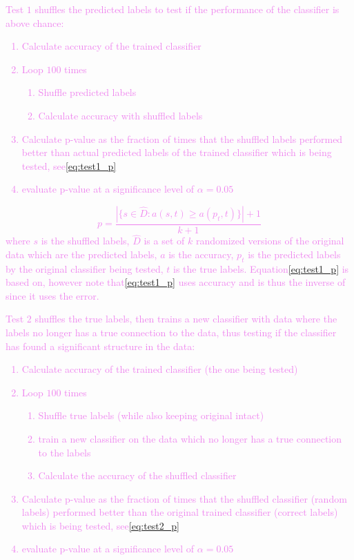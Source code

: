 \textcolor{violet}{Test $1$ shuffles the predicted labels to test if the performance of the classifier is above chance:
	\begin{enumerate}
		\item Calculate accuracy of the trained classifier
		\item Loop $100$ times
		      \begin{enumerate}
			      \item Shuffle predicted labels
			      \item Calculate accuracy with shuffled labels
		      \end{enumerate}
		\item Calculate p-value as the fraction of times that the shuffled labels performed better than actual predicted labels of the trained classifier which is being tested, see\:\eqref{eq:test1_p}
		\item evaluate p-value at a significance level of $\alpha = 0.05$
	\end{enumerate}
}
\textcolor{violet}{
	\begin{dmath}
		\label{eq:test1_p}
		p = \frac{|\{s\in\hat{D}: a(s,t) \ge a(p_t,t)\}|+1}{k+1}
	\end{dmath}
	where $s$ is the shuffled labels, $\hat{D}$ is a set of $k$ randomized versions of the original data which are the predicted labels, $a$ is the accuracy, $p_t$ is the predicted labels by the original classifier being tested, $t$ is the true labels. Equation\:\eqref{eq:test1_p} is based on\:\cite{ojalaPermutationTestsStudying2009}, however note that\:\eqref{eq:test1_p} uses accuracy and is thus the inverse of\:\cite{ojalaPermutationTestsStudying2009} since it uses the error.}

\textcolor{violet}{Test $2$ shuffles the true labels, then trains a new classifier with data where the labels no longer has a true connection to the data, thus testing if the classifier has found a significant structure in the data\:\cite{ojalaPermutationTestsStudying2009}\cite{noirhommeBiasedBinomialAssessment2014}:
	\begin{enumerate}
		\item Calculate accuracy of the trained classifier (the one being tested)
		\item Loop $100$ times
		      \begin{enumerate}
			      \item Shuffle true labels (while also keeping original intact)
			      \item train a new classifier on the data which no longer has a true connection to the labels
			      \item Calculate the accuracy of the shuffled classifier
		      \end{enumerate}
		\item Calculate p-value as the fraction of times that the shuffled classifier (random labels) performed better than the original trained classifier (correct labels) which is being tested\:\cite{ganzPermutationTestsClassification2017}\cite{noirhommeBiasedBinomialAssessment2014}, see\:\eqref{eq:test2_p}
		\item evaluate p-value at a significance level of $\alpha = 0.05$
	\end{enumerate}
}

